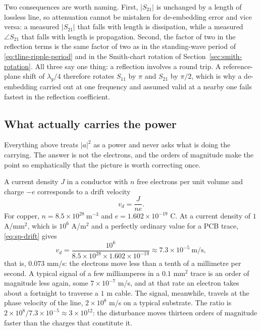 Two consequences are worth naming. First, $|S_{21}|$ is unchanged by a length of lossless line, so attenuation
cannot be mistaken for de-embedding error and vice versa: a measured $|S_{21}|$ that falls with length is
dissipation, while a measured $\angle S_{21}$ that falls with length is propagation. Second, the factor of two in
the reflection terms is the same factor of two as in the standing-wave period of \eqref{eq:tline-ripple-period}
and in the Smith-chart rotation of Section~\ref{sec:smith-rotation}. All three say one thing: a reflection
involves a round trip. A reference-plane shift of $\lambda_g/4$ therefore rotates $S_{11}$ by $\pi$ and
$S_{21}$ by $\pi/2$, which is why a de-embedding carried out at one frequency and assumed valid at a nearby one
fails fastest in the reflection coefficient.

\subsection{What actually carries the power}
\label{sec:sp-powerflow}

Everything above treats $|a|^2$ as a power and never asks what is doing the carrying. The answer is not the
electrons, and the orders of magnitude make the point so emphatically that the picture is worth correcting once.

A current density $J$ in a conductor with $n$ free electrons per unit volume and charge $-e$ corresponds to a
drift velocity
\begin{equation}
  v_d = \frac{J}{n e} .
  \label{eq:sp-drift}
\end{equation}
For copper, $n=8.5\times10^{28}\ \mathrm{m}^{-3}$ and $e=1.602\times10^{-19}$ C. At a current density of
$1$ A/mm$^2$, which is $10^{6}$ A/m$^2$ and a perfectly ordinary value for a PCB trace, \eqref{eq:sp-drift} gives
\begin{equation}
  v_d = \frac{10^{6}}{8.5\times10^{28}\times1.602\times10^{-19}}
      \approx 7.3\times10^{-5}\ \mathrm{m/s},
  \label{eq:sp-drift-num}
\end{equation}
that is, $0.073$ mm/s: the electrons move less than a tenth of a millimetre per second. A typical signal of a few
milliamperes in a $0.1$ mm$^2$ trace is an order of magnitude less again, some $7\times10^{-7}$ m/s, and at that
rate an electron takes about a fortnight to traverse a $1$ m cable. The signal, meanwhile, travels at the phase
velocity of the line, $2\times10^{8}$ m/s on a typical substrate. The ratio is
$2\times10^{8}/7.3\times10^{-5}\approx 3\times10^{12}$: the disturbance moves thirteen orders of magnitude faster
than the charges that constitute it.

